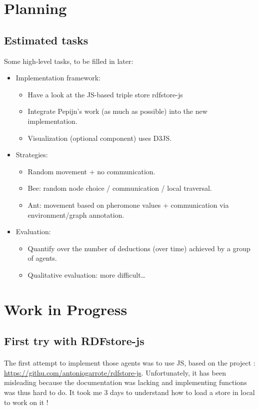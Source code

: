 \documentclass{article}
\newenvironment{itemh}[0]{\begin{itemize}[label=$\heartsuit$, font=\color{mygray} \small]}{\end{itemize}}
\newenvironment{itemH}[0]{\begin{itemize}[label=$\heartsuit$, font=\color{mygray} \large]}{\end{itemize}}
\begin{document}
\newpage
\section{Planning}
	\subsection{Estimated tasks}
		Some high-level tasks, to be filled in later:
		\begin{itemH}
			\item Implementation framework:
				\begin{itemh}
					\item Have a look at the JS-based triple store rdfstore-js
					\item Integrate Pepijn’s work (as much as possible)  into the new implementation.
					\item Visualization (optional component) uses D3JS.
				\end{itemh}
			\item Strategies:
				\begin{itemh}
					\item Random movement + no communication.
					\item Bee: random node choice / communication / local traversal.
					\item Ant: movement based on pheromone values + communication via environment/graph annotation.
				\end{itemh}
			\item Evaluation:
				\begin{itemh}
					\item Quantify over the number of deductions (over time) achieved by a group of agents.
					\item Qualitative evaluation: more difficult…
				\end{itemh}
		\end{itemH}

\section{Work in Progress}
	\subsection{First try with RDFstore-js}
		\paragraph{} The first attempt to implement those agents was to use JS, based on the project :
		\url{https://githu.com/antoniogarrote/rdfstore-js}.
		Unfortunately, it has been misleading because the documentation was lacking
		and implementing functions was thus hard to do.
		It took me 3 days to understand how to load a store in local to work on it !
\end{document}
